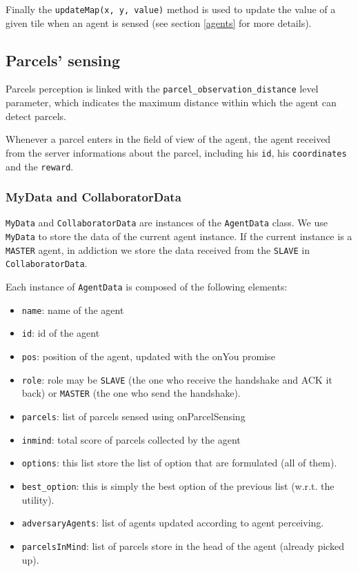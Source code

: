 \documentclass[10pt]{article}
\begin{document}
Finally the \texttt{updateMap(x, y, value)} method is used to update the value of a given tile when an agent is sensed (see section \ref{agents} for more details).

\subsection{Parcels' sensing}

Parcels perception is linked with the \texttt{parcel\_observation\_distance} level parameter, which indicates the maximum distance within which the agent can detect parcels. 

Whenever a parcel enters in the field of view of the agent, the agent received from the server informations about the parcel, including his \texttt{id}, his \texttt{coordinates} and the \texttt{reward}.    

\subsubsection{MyData and CollaboratorData}

\texttt{MyData} and \texttt{CollaboratorData} are instances of the \texttt{AgentData} class. We use \texttt{MyData} to store the data of the current agent instance. If the current instance is a \texttt{MASTER} agent, in addiction we store the data received from the \texttt{SLAVE} in \texttt{CollaboratorData}.

Each instance of \texttt{AgentData} is composed of the following elements:

\begin{itemize}
    \item \texttt{name}: name of the agent
    \item \texttt{id}: id of the agent
    \item \texttt{pos}: position of the agent, updated with the onYou promise
    \item \texttt{role}: role may be \texttt{SLAVE} (the one who receive the handshake and ACK it back) or \texttt{MASTER} (the one who send the handshake). 
    \item \texttt{parcels}: list of parcels sensed using onParcelSensing
    \item \texttt{inmind}: total score of parcels collected by the agent
    \item \texttt{options}: this list store the list of option that are formulated (all of them).
    \item \texttt{best\_option}: this is simply the best option of the previous list (w.r.t. the utility).
    \item \texttt{adversaryAgents}: list of agents updated according to agent perceiving. 
    \item \texttt{parcelsInMind}: list of parcels store in the head of the agent (already picked up).
\end{itemize}
\end{document}
